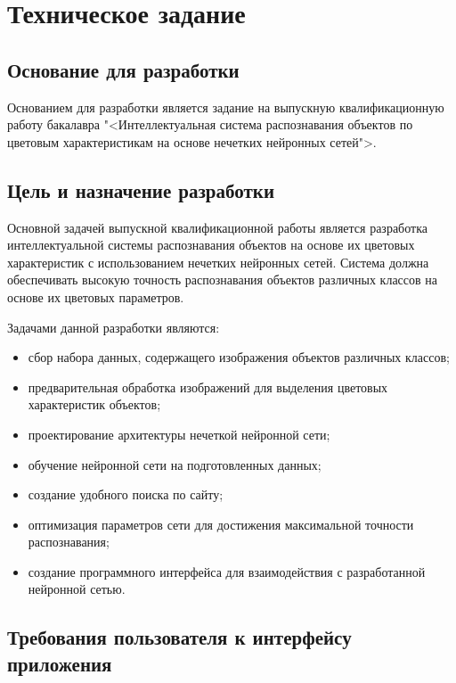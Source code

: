 \section{Техническое задание}
\subsection{Основание для разработки}

Основанием для разработки является задание на выпускную квалификационную работу бакалавра "<Интеллектуальная система распознавания объектов по цветовым характеристикам на основе нечетких нейронных сетей">.

\subsection{Цель и назначение разработки}

Основной задачей выпускной квалификационной работы является разработка интеллектуальной системы распознавания объектов на основе их цветовых характеристик с использованием нечетких нейронных сетей. Система должна обеспечивать высокую точность распознавания объектов различных классов на основе их цветовых параметров.

Задачами данной разработки являются:
\begin{itemize}
\item сбор набора данных, содержащего изображения объектов различных классов;
\item предварительная обработка изображений для выделения цветовых характеристик объектов;
\item проектирование архитектуры нечеткой нейронной сети;
\item обучение нейронной сети на подготовленных данных;
\item создание удобного поиска по сайту;
\item оптимизация параметров сети для достижения максимальной точности распознавания;
\item создание программного интерфейса для взаимодействия с разработанной нейронной сетью.
\end{itemize}

\subsection{Требования пользователя к интерфейсу приложения}

